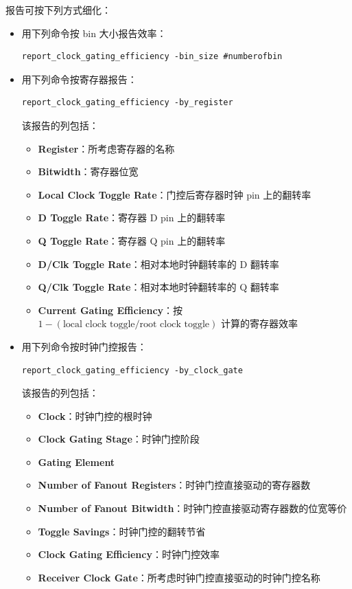 报告可按下列方式细化：
\begin{itemize}
  \item 用下列命令按 bin 大小报告效率：
\begin{lstlisting}
report_clock_gating_efficiency -bin_size #numberofbin
\end{lstlisting}
  \item 用下列命令按寄存器报告：
\begin{lstlisting}
report_clock_gating_efficiency -by_register
\end{lstlisting}
该报告的列包括：
  \begin{itemize}
    \item \textbf{Register}：所考虑寄存器的名称
    \item \textbf{Bitwidth}：寄存器位宽
    \item \textbf{Local Clock Toggle Rate}：门控后寄存器时钟 pin 上的翻转率
    \item \textbf{D Toggle Rate}：寄存器 D pin 上的翻转率
    \item \textbf{Q Toggle Rate}：寄存器 Q pin 上的翻转率
    \item \textbf{D/Clk Toggle Rate}：相对本地时钟翻转率的 D 翻转率
    \item \textbf{Q/Clk Toggle Rate}：相对本地时钟翻转率的 Q 翻转率
    \item \textbf{Current Gating Efficiency}：按 \(1 - (\text{local clock toggle} / \text{root clock toggle})\) 计算的寄存器效率
  \end{itemize}
  \item 用下列命令按时钟门控报告：
\begin{lstlisting}
report_clock_gating_efficiency -by_clock_gate
\end{lstlisting}
该报告的列包括：
  \begin{itemize}
    \item \textbf{Clock}：时钟门控的根时钟
    \item \textbf{Clock Gating Stage}：时钟门控阶段
    \item \textbf{Gating Element}
    \item \textbf{Number of Fanout Registers}：时钟门控直接驱动的寄存器数
    \item \textbf{Number of Fanout Bitwidth}：时钟门控直接驱动寄存器数的位宽等价
    \item \textbf{Toggle Savings}：时钟门控的翻转节省
    \item \textbf{Clock Gating Efficiency}：时钟门控效率
    \item \textbf{Receiver Clock Gate}：所考虑时钟门控直接驱动的时钟门控名称
  \end{itemize}
\end{itemize}

